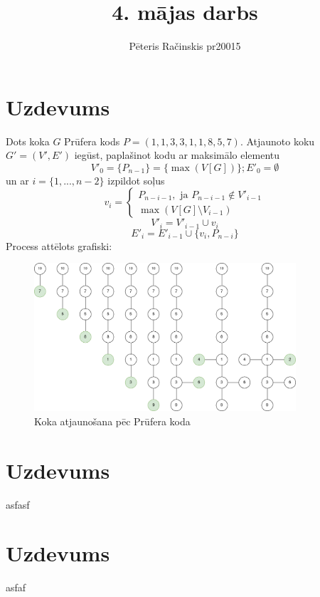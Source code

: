 \documentclass[12pt, a4paper]{article}
\author{Pēteris Račinskis pr20015}
\begin{document}
\title{4. mājas darbs}

\maketitle

\section{Uzdevums}

Dots koka $G$ Prūfera kods $P=(1,1,3,3,1,1,8,5,7)$. Atjaunoto koku $G' = (V',E')$ iegūst, paplašinot kodu ar maksimālo elementu
\begin{equation}
    V'_0 = \lbrace P_{n-1} \rbrace = \lbrace \max(V[G]) \rbrace; E'_0=\emptyset
\end{equation}
un ar $i=\lbrace 1, ..., n-2 \rbrace$ izpildot soļus
\begin{equation}
    v_i = 
\begin{cases}
    P_{n-i-1}, \text{ ja } P_{n-i-1} \notin V'_{i-1} \\
    \max(V[G] \setminus V_{i-1})
\end{cases}
\end{equation}
\begin{equation}
    V'_i = V'_{i-1} \cup v_i
\end{equation}
\begin{equation}
    E'_i = E'_{i-1} \cup \lbrace v_i, P_{n-i} \rbrace
\end{equation}
Process attēlots grafiski:

\begin{figure}[h!]
    \centering
    \includegraphics[height=5.5cm,page=1]{pruefer.png}
    \caption{Koka atjaunošana pēc Prūfera koda}
\end{figure}

\newpage
\section{Uzdevums}

asfasf

\section{Uzdevums}

asfaf
\end{document}
